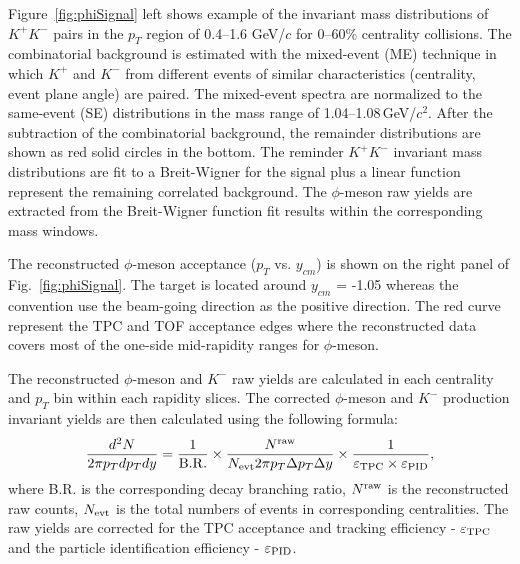 \documentclass[%
 reprint,	
showpacs,
 amsmath,amssymb,
 aps,
 prc,
]{revtex4-1}
\begin{document}
Figure~\ref{fig:phiSignal} left shows example of the invariant mass distributions of $K^+K^-$ pairs in the $p_{T}$ region of 0.4--1.6 GeV/$c$ for 0--60\% centrality collisions. The combinatorial background is estimated with the mixed-event (ME) technique in which $K^+$ and $K^-$ from different events of similar characteristics (centrality, event plane angle) are paired. The mixed-event spectra are normalized to the same-event (SE) distributions in the mass range of 1.04--1.08\,GeV/$c^2$. After the subtraction of the combinatorial background, the remainder distributions are shown as red solid circles in the bottom. The reminder $K^+K^-$ invariant mass distributions are fit to a Breit-Wigner for the signal plus a linear function represent the remaining correlated background. The $\phi$-meson raw yields are extracted from the Breit-Wigner function fit results within the corresponding mass windows.



The reconstructed $\phi$-meson acceptance ($p_T$ vs. $y_{cm}$) is shown on the right panel of Fig.~\ref{fig:phiSignal}. The target is located around $y_{cm}$ = -1.05 whereas the convention use the beam-going direction as the positive direction. The red curve represent the TPC and TOF acceptance edges where the reconstructed data covers most of the one-side mid-rapidity ranges for $\phi$-meson.


The reconstructed $\phi$-meson and $K^-$ raw yields are calculated in each centrality and $p_{T}$ bin within each rapidity slices. The corrected $\phi$-meson and $K^-$ production invariant yields are then calculated using the following formula:
\begin{equation}
  \begin{aligned}
 \frac{d^2N}{2\pi p_{T}dp_{T}dy} = \frac{1}{\rm B.R.} \times \frac{N^{\rm raw}}{N_{\rm evt} 2\pi p_{T}\Delta p_{T}\Delta y} \times \frac{1}{\varepsilon_{\rm TPC}\times\varepsilon_{\rm PID}},
  \end{aligned}
\label{equ:invariantyield}
\end{equation}
where B.R. is the corresponding decay branching ratio, $N^{\rm raw}$ is the reconstructed raw counts, $N_{\rm evt}$ is the total numbers of events in corresponding centralities. The raw yields are corrected for the TPC acceptance and tracking efficiency - $\varepsilon_{\rm TPC}$ and the particle identification efficiency - $\varepsilon_{\rm PID}$.
\end{document}
